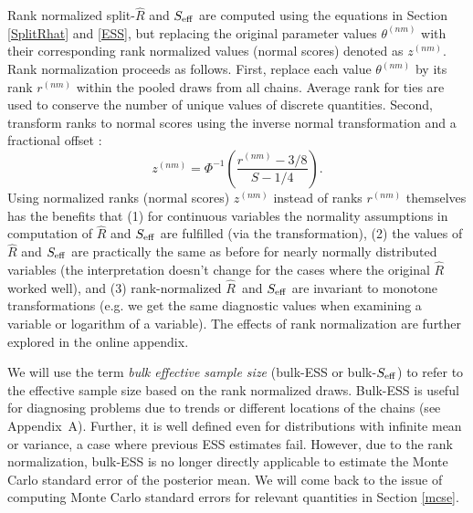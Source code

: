 \documentclass[american,]{article}
\newcommand{\Rhat}{$\widehat{R}$}
\theoremstyle{definition}
\begin{document}
Rank normalized split-\(\widehat{R}\) and \(S_{\rm eff}\) are
computed using the equations in Section \ref{SplitRhat} and \ref{ESS}, but
replacing the original parameter values \(\theta^{(nm)}\) with their
corresponding rank normalized values (normal scores) denoted as \(z^{(nm)}\). Rank
normalization proceeds as follows.  First, replace each value
\(\theta^{(nm)}\) by its rank \(r^{(nm)}\) within the pooled draws
from all chains.  Average rank for ties are used to conserve the
number of unique values of discrete quantities.  Second, transform
ranks to normal scores using the inverse normal transformation and
a fractional offset \citep{Blom:1958}:
\begin{equation}
z^{(nm)} = \Phi^{-1}\left(\frac{r^{(nm)}-3/8}{S-1/4}\right).
\end{equation}
Using normalized ranks (normal scores)
\(z^{(nm)}\) instead of ranks \(r^{(nm)}\) themselves has the
benefits that (1) for continuous variables the normality assumptions in computation of \(\widehat{R}\) and \(S_{\rm eff}\) are fulfilled (via the transformation), (2) the values of \(\widehat{R}\) and \(S_{\rm eff}\) are practically the
same as before for nearly normally distributed variables (the interpretation doesn't change for the cases where the original \(\widehat{R}\) worked well), and (3) rank-normalized 
\Rhat\ and \(S_{\rm eff}\) are invariant to monotone transformations (e.g. we get the same diagnostic values when examining a variable or logarithm of a variable).
The effects of rank normalization are further explored in the online appendix.

We will use the term \emph{bulk effective sample size} (bulk-ESS or
bulk-\(S_{\rm eff}\)) to refer to the effective sample size based on the
rank normalized draws. Bulk-ESS is useful for diagnosing problems due to
trends or different locations of the chains (see Appendix~A). Further, it is
well defined even for distributions with infinite mean or variance, a
case where previous ESS estimates fail. However, due to the rank
normalization, bulk-ESS is no longer directly applicable to estimate the
Monte Carlo standard error of the posterior mean. We will come back to
the issue of computing Monte Carlo standard errors for relevant
quantities in Section \ref{mcse}.
\end{document}
